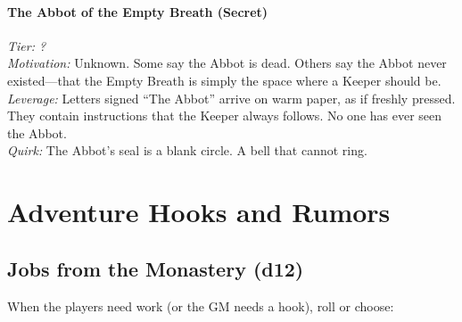 \documentclass[11pt]{book}
\begin{document}
\subsection*{The Abbot of the Empty Breath (Secret)}

\textit{Tier: ?} \\
\textit{Motivation:} Unknown. Some say the Abbot is dead. Others say the Abbot never existed---that the Empty Breath is simply the space where a Keeper should be. \\
\textit{Leverage:} Letters signed ``The Abbot'' arrive on warm paper, as if freshly pressed. They contain instructions that the Keeper always follows. No one has ever seen the Abbot. \\
\textit{Quirk:} The Abbot's seal is a blank circle. A bell that cannot ring.

\part{Adventure Hooks and Rumors}

\chapter{Jobs from the Monastery (d12)}

When the players need work (or the GM needs a hook), roll or choose:
\end{document}
